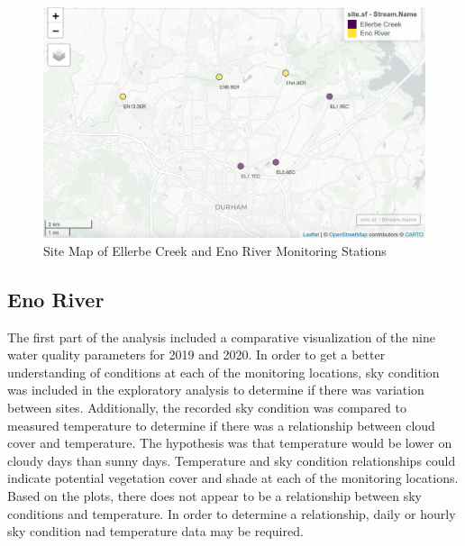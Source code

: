 \documentclass[
  12pt,
]{article}
\begin{document}
\begin{figure}

{\centering \includegraphics[width=1\linewidth]{Output/SiteMap} 

}

\caption{Site Map of Ellerbe Creek and Eno River Monitoring Stations}\label{fig:unnamed-chunk-1}
\end{figure}

\hypertarget{eno-river}{%
\subsection{Eno River}\label{eno-river}}

The first part of the analysis included a comparative visualization of
the nine water quality parameters for 2019 and 2020. In order to get a
better understanding of conditions at each of the monitoring locations,
sky condition was included in the exploratory analysis to determine if
there was variation between sites. Additionally, the recorded sky
condition was compared to measured temperature to determine if there was
a relationship between cloud cover and temperature. The hypothesis was
that temperature would be lower on cloudy days than sunny days.
Temperature and sky condition relationships could indicate potential
vegetation cover and shade at each of the monitoring locations. Based on
the plots, there does not appear to be a relationship between sky
conditions and temperature. In order to determine a relationship, daily
or hourly sky condition nad temperature data may be required.
\end{document}
